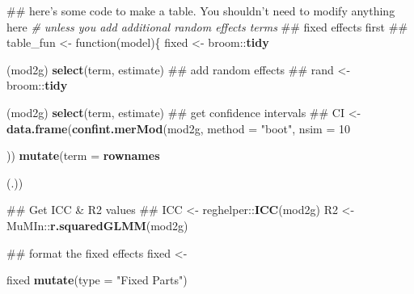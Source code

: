 \documentclass[]{article}
\newenvironment{Shaded}{\begin{snugshade}}{\end{snugshade}}
\newcommand{\KeywordTok}[1]{\textcolor[rgb]{0.13,0.29,0.53}{\textbf{{#1}}}}
\newcommand{\DataTypeTok}[1]{\textcolor[rgb]{0.13,0.29,0.53}{{#1}}}
\newcommand{\DecValTok}[1]{\textcolor[rgb]{0.00,0.00,0.81}{{#1}}}
\newcommand{\StringTok}[1]{\textcolor[rgb]{0.31,0.60,0.02}{{#1}}}
\newcommand{\CommentTok}[1]{\textcolor[rgb]{0.56,0.35,0.01}{\textit{{#1}}}}
\newcommand{\NormalTok}[1]{{#1}}
\begin{document}
\begin{Shaded}
\begin{Highlighting}[]
\NormalTok{## here's some code to make a table. You shouldn't need to modify anything here }
\CommentTok{# unless you add additional random effects terms}
\NormalTok{## fixed effects first ##}
\NormalTok{table_fun <-}\StringTok{ }\NormalTok{function(model)\{}
    \NormalTok{fixed <-}\StringTok{ }\NormalTok{broom::}\KeywordTok{tidy}\NormalTok{(mod2g) %
\StringTok{    }\KeywordTok{select}\NormalTok{(term, estimate) }
  \NormalTok{## add random effects ##}
  \NormalTok{rand <-}\StringTok{ }\NormalTok{broom::}\KeywordTok{tidy}\NormalTok{(mod2g) %
\StringTok{    }\KeywordTok{select}\NormalTok{(term, estimate)}
  \NormalTok{## get confidence intervals ##}
  \NormalTok{CI <-}\StringTok{ }\KeywordTok{data.frame}\NormalTok{(}\KeywordTok{confint.merMod}\NormalTok{(mod2g, }\DataTypeTok{method =} \StringTok{"boot"}\NormalTok{, }\DataTypeTok{nsim =} \DecValTok{10}\NormalTok{)) %
\StringTok{    }\KeywordTok{mutate}\NormalTok{(}\DataTypeTok{term =} \KeywordTok{rownames}\NormalTok{(.)) %
  
  \NormalTok{## Get ICC & R2 values ##}
  \NormalTok{ICC <-}\StringTok{ }\NormalTok{reghelper::}\KeywordTok{ICC}\NormalTok{(mod2g)}
  \NormalTok{R2 <-}\StringTok{ }\NormalTok{MuMIn::}\KeywordTok{r.squaredGLMM}\NormalTok{(mod2g)}
  
  \NormalTok{## format the fixed effects}
  \NormalTok{fixed <-}\StringTok{ }\NormalTok{fixed %
\StringTok{    }\KeywordTok{mutate}\NormalTok{(}\DataTypeTok{type =} \StringTok{"Fixed Parts"}\NormalTok{)}
  
}}}}}
\end{Highlighting}
\end{Shaded}
\end{document}
